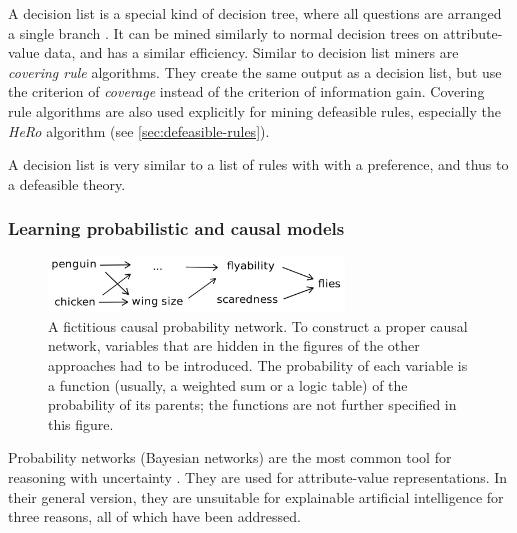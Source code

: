 A decision list is a special kind of decision tree, where all questions are arranged a single branch \cite[ch.~18.5.1]{russellArtificialIntelligenceModern2010}. It can be mined similarly to normal decision trees on attribute-value data, and has a similar efficiency. Similar to decision list miners are \textit{covering rule} algorithms. They create the same output as a decision list, but use the criterion of \textit{coverage} instead of the criterion of information gain. Covering rule algorithms are also used explicitly for mining defeasible rules, especially the \textit{HeRo} algorithm (see \autoref{sec:defeasible-rules}). 

A decision list is very similar to a list of rules with with a preference, and thus to a defeasible theory. %

\subsubsection{Learning probabilistic and causal models}

\begin{figure}[htb]
        \centering
        \includegraphics[width=0.7\textwidth]{images/causal-net.png}
        \caption{A fictitious causal probability network. To construct a proper causal network, variables that are hidden in the figures of the other approaches had to be introduced. The probability of each variable is a function (usually, a weighted sum or a logic table) of the probability of its parents; the functions are not further specified in this figure.}
        \label{fig:causal-network}
\end{figure}

Probability networks (Bayesian networks) are the most common tool for reasoning with uncertainty \citep[ch.~14.2]{russellArtificialIntelligenceModern2010}. They are used for attribute-value representations. In their general version, they are unsuitable for explainable artificial intelligence for three reasons, all of which have been addressed.

